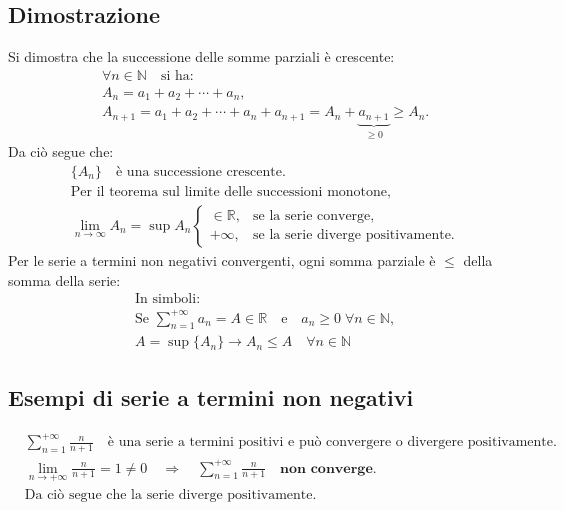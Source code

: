 \documentclass{article}
\begin{document}
\subsection*{Dimostrazione}
Si dimostra che la successione delle somme parziali è crescente:
\begin{align*}
    &\forall n \in \mathbb{N} \quad \text{si ha:} \\
    &A_n = a_1 + a_2 + \cdots + a_n, \\
    &A_{n+1} = a_1 + a_2 + \cdots + a_n + a_{n+1} = A_n + \underbrace{a_{n+1}}_{\geq 0} \geq A_n.
\end{align*}
Da ciò segue che:
\begin{align*}
    &\{A_n\} \quad \text{è una successione crescente.} \\
    &\text{Per il teorema sul limite delle successioni monotone,} \\
    &\lim_{n \to \infty} A_n = \sup A_n \begin{cases}
        \in \mathbb{R}, & \text{se la serie converge}, \\
        +\infty, & \text{se la serie diverge positivamente.}
    \end{cases}
\end{align*}
Per le serie a termini non negativi convergenti, ogni somma parziale è $\leq$ della somma della serie:
\begin{align*}
    &\text{In simboli:} \\
    &\text{Se } \sum_{n=1}^{+\infty} a_n = A \in \mathbb{R} \quad \text{e} \quad a_n \geq 0 \; \forall n \in \mathbb{N}, \\
    &A = \sup \{A_n\} \to A_n \leq A \quad \forall n \in \mathbb{N}
\end{align*}

\subsection*{Esempi di serie a termini non negativi}
\begin{align*}
    &\sum_{n=1}^{+\infty} \frac{n}{n+1} \quad \text{è una serie a termini positivi e può convergere o divergere positivamente.} \\
    &\lim_{n \to +\infty} \frac{n}{n+1} = 1 \neq 0 \quad \Rightarrow \quad \sum_{n=1}^{+\infty} \frac{n}{n+1} \quad \textbf{non converge.} \\
    &\text{Da ciò segue che la serie diverge positivamente.}
\end{align*}
\end{document}
